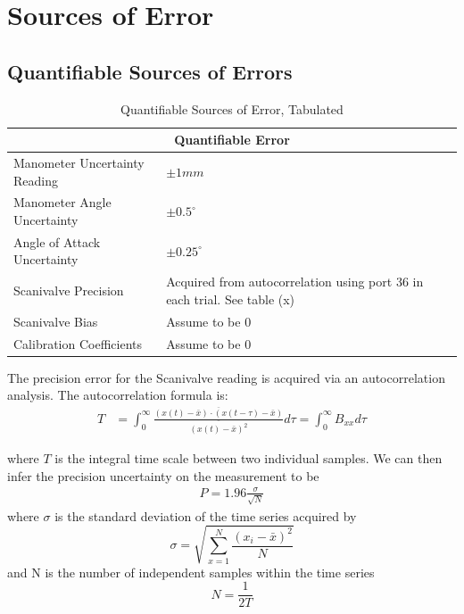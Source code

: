 \documentclass[runningheads]{llncs}
\begin{document}


\section{Sources of Error}\label{sec:source_of_error}

\subsection{Quantifiable Sources of Errors}
\begin{table}[H]
\begin{center}
    \begin{tabular}{ll}
        \toprule
        \multicolumn{2}{c}{Quantifiable Error}\\
        \midrule
        Manometer Uncertainty Reading & $\pm 1 \si{mm}$\\
        Manometer Angle Uncertainty & $\pm 0.5^\circ$ \\
        Angle of Attack Uncertainty & $\pm 0.25^\circ$ \\
        Scanivalve Precision & Acquired from autocorrelation using port 36 in each trial. See table (x)\\
        Scanivalve Bias & Assume to be 0 \\
        Calibration Coefficients & Assume to be 0\\
        \bottomrule
\end{tabular}
\end{center}
\caption{Quantifiable Sources of Error, Tabulated}
\label{tab:quant_error}
\end{table}

The precision error for the Scanivalve reading is acquired via an autocorrelation analysis. The autocorrelation formula is:
\begin{align}\label{eq:autocorrelation}
    T &= \int_{0}^{\infty} \frac{\overline{(x(t)-\bar{x})\cdot(x(t-\tau)-\bar{x})}}{\overline{(x(t) - \bar{x})^2}} d\tau = \int_{0}^{\infty} B_{xx} d\tau
\end{align}

where $T$ is the integral time scale between two individual samples. We can then infer the precision uncertainty on the measurement to be
\begin{align}\label{eq:scanivalve_err}
    P = 1.96 \frac{\sigma}{\sqrt{N}}
\end{align}
where $\sigma$ is the standard deviation of the time series acquired by 
\begin{equation*}
    \sigma = \sqrt{\sum_{x = 1}^{N}\frac{(x_i - \bar{x})^2}{N}}
\end{equation*}
and N is the number of independent samples within the time series $$N = \frac{1}{2T}$$
\end{document}
